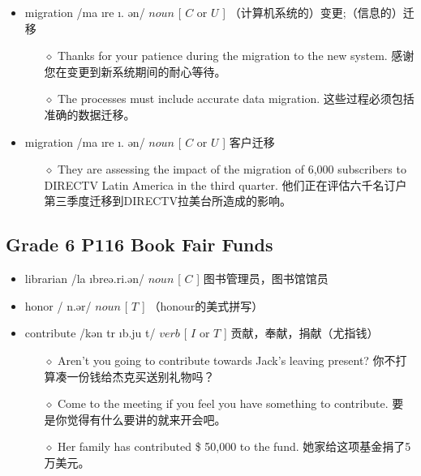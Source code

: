 \documentclass[a4paper,top=2.5cm,buttom=2.5cm10.5pt]{book}
\begin{document}
\begin{itemize}
\item migration /ma \i  \textprimstress  \textscriptg re \i . \textesh ən/ $ noun $ [  $ C $  or  $ U $  ] （计算机系统的）变更;（信息的）迁移
\begin{itemize}
\item[$\diamond$] Thanks for your patience during the migration to the new system.
感谢您在变更到新系统期间的耐心等待。
\item[$\diamond$] The processes must include accurate data migration.
这些过程必须包括准确的数据迁移。
\end{itemize}
\end{itemize}
\begin{itemize}
\item migration /ma \i  \textprimstress  \textscriptg re \i . \textesh ən/ $ noun $ [  $ C $  or  $ U $  ] 客户迁移
\begin{itemize}
\item[$\diamond$] They are assessing the impact of the migration of 6,000 subscribers to DIRECTV Latin America in the third quarter.
他们正在评估六千名订户第三季度迁移到DIRECTV拉美台所造成的影响。
\end{itemize}
\end{itemize}
\textcolor[RGB]{128,0,255}{\section{Grade 6 P116 Book Fair Funds}}
\begin{itemize}
\item librarian /la \i  \textprimstress breə.ri.ən/ $ noun $ [  $ C $  ] 图书管理员，图书馆馆员
\end{itemize}
\begin{itemize}
\item honor / \textprimstress  \textturnscripta n.ər/ $ noun $ [  $ T $  ] （honour的美式拼写）
\end{itemize}
\begin{itemize}
\item contribute /kən \textprimstress tr \i b.ju \textlengthmark t/ $ verb $ [  $ I $  or  $ T $  ] 贡献，奉献，捐献（尤指钱）
\begin{itemize}
\item[$\diamond$] Aren't you going to contribute towards Jack's leaving present?
你不打算凑一份钱给杰克买送别礼物吗？
\item[$\diamond$] Come to the meeting if you feel you have something to contribute.
要是你觉得有什么要讲的就来开会吧。
\item[$\diamond$] Her family has contributed  \$ 50,000 to the fund.
她家给这项基金捐了5万美元。
\end{itemize}
\end{itemize}
\end{document}

